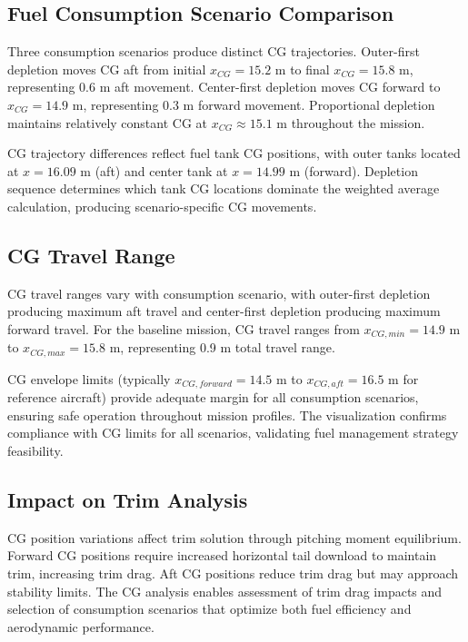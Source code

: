 \subsection{Fuel Consumption Scenario Comparison}

Three consumption scenarios produce distinct CG trajectories. Outer-first depletion moves CG aft from initial $x_{CG} = 15.2$ m to final $x_{CG} = 15.8$ m, representing 0.6 m aft movement. Center-first depletion moves CG forward to $x_{CG} = 14.9$ m, representing 0.3 m forward movement. Proportional depletion maintains relatively constant CG at $x_{CG} \approx 15.1$ m throughout the mission.

CG trajectory differences reflect fuel tank CG positions, with outer tanks located at $x = 16.09$ m (aft) and center tank at $x = 14.99$ m (forward). Depletion sequence determines which tank CG locations dominate the weighted average calculation, producing scenario-specific CG movements.

\subsection{CG Travel Range}

CG travel ranges vary with consumption scenario, with outer-first depletion producing maximum aft travel and center-first depletion producing maximum forward travel. For the baseline mission, CG travel ranges from $x_{CG,min} = 14.9$ m to $x_{CG,max} = 15.8$ m, representing 0.9 m total travel range.

CG envelope limits (typically $x_{CG,forward} = 14.5$ m to $x_{CG,aft} = 16.5$ m for reference aircraft) provide adequate margin for all consumption scenarios, ensuring safe operation throughout mission profiles. The visualization confirms compliance with CG limits for all scenarios, validating fuel management strategy feasibility.

\subsection{Impact on Trim Analysis}

CG position variations affect trim solution through pitching moment equilibrium. Forward CG positions require increased horizontal tail download to maintain trim, increasing trim drag. Aft CG positions reduce trim drag but may approach stability limits. The CG analysis enables assessment of trim drag impacts and selection of consumption scenarios that optimize both fuel efficiency and aerodynamic performance.
